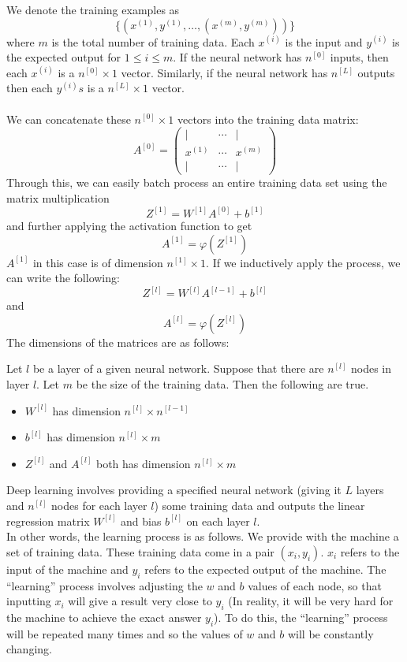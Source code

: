 \documentclass[a4paper]{article}
\begin{document}
We denote the training examples as $$\{(x^{(1)}, y^{(1)},\dots,(x^{(m)},y^{(m)}))\}$$ where $m$ is the total number of training data. Each $x^{(i)}$ is the input and $y^{(i)}$ is the expected output for $1\leq i\leq m$. If the neural network has $n^{[0]}$ inputs, then each $x^{(i)}$ is a $n^{[0]}\times 1$ vector. Similarly, if the neural network has $n^{[L]}$ outputs then each $y^{(i)}s$ is a $n^{[L]}\times 1$ vector. \\~\\

We can concatenate these $n^{[0]}\times 1$ vectors into the training data matrix: $$A^{[0]}=\begin{pmatrix}
| & \cdots & |\\
x^{(1)} & \cdots & x^{(m)}\\
| & \cdots & |
\end{pmatrix}$$ Through this, we can easily batch process an entire training data set using the matrix multiplication $$Z^{[1]}=W^{[1]}A^{[0]}+b^{[1]}$$ and further applying the activation function to get $$A^{[1]}=\varphi(Z^{[1]})$$ $A^{[1]}$ in this case is of dimension $n^{[1]}\times 1$. If we inductively apply the process, we can write the following: $$Z^{[l]}=W^{[l]}A^{[l-1]}+b^{[l]}$$ and $$A^{[l]}=\varphi(Z^{[l]})$$ The dimensions of the matrices are as follows: 

\begin{thm}{}{} Let $l$ be a layer of a given neural network. Suppose that there are $n^{[l]}$ nodes in layer $l$. Let $m$ be the size of the training data. Then the following are true. 
\begin{itemize}
\item $W^{[l]}$ has dimension $n^{[l]}\times n^{[l-1]}$
\item $b^{[l]}$ has dimension $n^{[l]}\times m$
\item $Z^{[l]}$ and $A^{[l]}$ both has dimension $n^{[l]}\times m$
\end{itemize}
\end{thm}

Deep learning involves providing a specified neural network (giving it $L$ layers and $n^{[l]}$ nodes for each layer $l$) some training data and outputs the linear regression matrix $W^{[l]}$ and bias $b^{[l]}$ on each layer $l$. \\

In other words, the learning process is as follows. We provide with the machine a set of training data. These training data come in a pair $(x_i,y_i)$. $x_i$ refers to the input of the machine and $y_i$ refers to the expected output of the machine. The ``learning'' process involves adjusting the $w$ and $b$ values of each node, so that inputting $x_i$ will give a result very close to $y_i$ (In reality, it will be very hard for the machine to achieve the exact answer $y_i$). To do this, the ``learning'' process will be repeated many times and so the values of $w$ and $b$ will be constantly changing. \\
\end{document}
